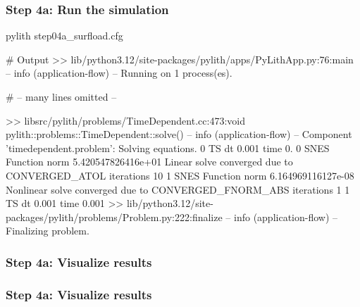 \documentclass[aspectratio=169]{beamer}
\begin{document}
\begin{frame}[fragile]
  \frametitle{Step 4a: Run the simulation}
  \summary{}

\begin{pyrejournal}
pylith step04a_surfload.cfg

# Output
 >> lib/python3.12/site-packages/pylith/apps/PyLithApp.py:76:main
 -- info (application-flow)
 -- Running on 1 process(es).

# -- many lines omitted --

 >> libsrc/pylith/problems/TimeDependent.cc:473:void pylith::problems::TimeDependent::solve()
 -- info (application-flow)
 -- Component 'timedependent.problem': Solving equations.
0 TS dt 0.001 time 0.
    0 SNES Function norm 5.420547826416e+01
      Linear solve converged due to CONVERGED_ATOL iterations 10
    1 SNES Function norm 6.164969116127e-08
    Nonlinear solve converged due to CONVERGED_FNORM_ABS iterations 1
1 TS dt 0.001 time 0.001
 >> lib/python3.12/site-packages/pylith/problems/Problem.py:222:finalize
 -- info (application-flow)
 -- Finalizing problem.
\end{pyrejournal}
  
\end{frame}


\begin{frame}
  \frametitle{Step 4a: Visualize results}

    
\end{frame}


\begin{frame}
  \frametitle{Step 4a: Visualize results}

    
\end{frame}
\end{document}
